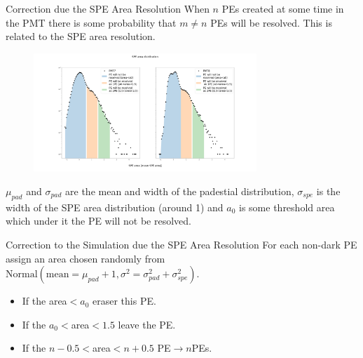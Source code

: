 \documentclass{beamer}
\begin{document}
\begin{frame}{Correction due the SPE Area Resolution}
When $n$ PEs created at some time in the PMT there is some probability that $m\neq n$ PEs will be resolved. This is related to the SPE area resolution. 

\begin{figure}[h]
\includegraphics[width=0.75\textwidth]{SPE_area.png}
\end{figure}

$\mu_{pad}$ and $\sigma_{pad}$ are the mean and width of the padestial distribution, $\sigma_{spe}$ is the width of the SPE area distribution (around 1) and $a_0$ is some threshold area which under it the PE will not be resolved. 
\end{frame}

\begin{frame}{Correction to the Simulation due the SPE Area Resolution}
For each non-dark PE assign an area chosen randomly from $\text{Normal}\left(\text{mean}=\mu_{pad}+1, \sigma^2=\sigma_{pad}^2+\sigma_{spe}^2\right)$.\\
\begin{itemize}
\item If the area$<a_0$ eraser this PE.\\
\item If the $a_0<$area$<1.5$ leave the PE.\\
\item If the $n-0.5<$area$<n+0.5$ PE$\rightarrow n$PEs.
\end{itemize}

\end{frame}
\end{document}
